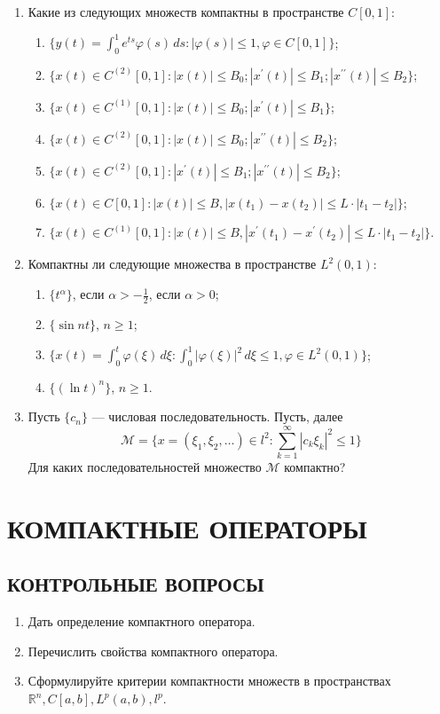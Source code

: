 \documentclass[12pt,a4paper]{article}
\begin{document}
\begin{enumerate}
\item Какие из следующих множеств компактны в пространстве $C[0,1]$:
\begin{enumerate}[label=\alph*)]
\item $\{y(t) = \int_{0}^{1} e^{ts}\varphi(s) \, ds : |\varphi(s)| \le 1, \varphi \in C[0,1]\}$;
\item $\{x(t) \in C^{(2)}[0,1] : |x(t)| \le B_{0}; |x^{\prime}(t)| \le B_{1}; |x^{\prime\prime}(t)| \le B_{2}\}$;
\item $\{x(t) \in C^{(1)}[0,1] : |x(t)| \le B_{0}; |x^{\prime}(t)| \le B_{1}\}$;
\item $\{x(t) \in C^{(2)}[0,1] : |x(t)| \le B_{0}; |x^{\prime\prime}(t)| \le B_{2}\}$;
\item $\{x(t) \in C^{(2)}[0,1] : |x^{\prime}(t)| \le B_{1}; |x^{\prime\prime}(t)| \le B_{2}\}$;
\item $\{x(t) \in C[0,1] : |x(t)| \le B, |x(t_{1}) - x(t_{2})| \le L \cdot |t_{1} - t_{2}|\}$;
\item $\{x(t) \in C^{(1)}[0,1] : |x(t)| \le B, |x^{\prime}(t_{1}) - x^{\prime}(t_{2})| \le L \cdot |t_{1} - t_{2}|\}$.
\end{enumerate}

\item Компактны ли следующие множества в пространстве $L^{2}(0,1)$:
\begin{enumerate}[label=\alph*)]
\item $\{t^{\alpha}\}$, если $\alpha > -\frac{1}{2}$, если $\alpha > 0$;
\item $\{\sin nt\}$, $n \ge 1$;
\item $\{x(t) = \int_{0}^{t} \varphi(\xi) \, d\xi : \int_{0}^{1} |\varphi(\xi)|^{2} \, d\xi \le 1, \varphi \in L^{2}(0,1)\}$;
\item $\{(\ln t)^{n}\}$, $n \ge 1$.
\end{enumerate}

\item Пусть $\{c_{n}\}$ — числовая последовательность. Пусть, далее
$$ \mathcal{M} = \{x = (\xi_{1}, \xi_{2}, \dots) \in l^{2} : \sum_{k=1}^{\infty} |c_{k}\xi_{k}|^{2} \le 1\} $$
Для каких последовательностей множество $\mathcal{M}$ компактно?
\end{enumerate}

\section{КОМПАКТНЫЕ ОПЕРАТОРЫ}

\subsection*{КОНТРОЛЬНЫЕ ВОПРОСЫ}
\begin{enumerate}
\item Дать определение компактного оператора.
\item Перечислить свойства компактного оператора.
\item Сформулируйте критерии компактности множеств в пространствах $\mathbb{R}^{n}, C[a,b], L^{p}(a,b), l^{p}$.
\end{enumerate}
\end{document}
